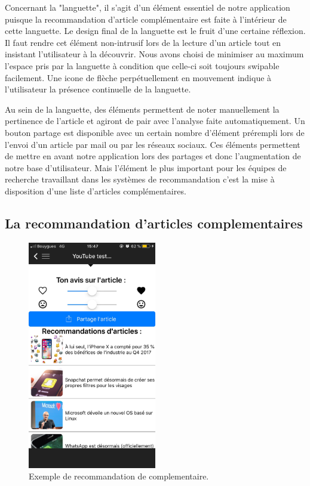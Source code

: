 Concernant la "languette", il s'agit d'un élément essentiel de notre application puisque la recommandation d'article complémentaire est faite à l'intérieur de cette languette. Le design final de la languette est le fruit d'une certaine réflexion. Il faut rendre cet élément non-intrusif lors de la lecture d'un article tout en insistant l'utilisateur à la découvrir. Nous avons choisi de minimiser au maximum l'espace pris par la languette à condition que celle-ci soit toujours swipable facilement. Une icone de flèche perpétuellement en mouvement indique à l'utilisateur la présence continuelle de la languette. 

Au sein de la languette, des éléments permettent de noter manuellement la pertinence de l'article et agiront de pair avec l'analyse faite automatiquement. Un bouton partage est disponible avec un certain nombre d'élément prérempli lors de l'envoi d'un article par mail ou par les réseaux sociaux. Ces éléments permettent de mettre en avant notre application lors des partages et donc l'augmentation de notre base d'utilisateur. Mais l'élément le plus important pour les équipes de recherche travaillant dans les systèmes de recommandation c'est la mise à disposition d'une liste d'articles complémentaires.


\subsection{La recommandation d'articles complementaires}

\begin{figure}[htp]
  \centering
  \includegraphics[height=10cm]{images/comp}
  \caption{Exemple de  recommandation de complementaire.}
  \label{fig:screen-comple}
\end{figure}


